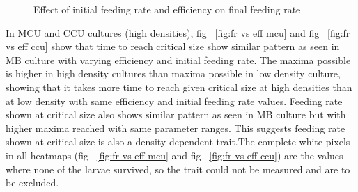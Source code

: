 \begin{figure}[h]
\caption{Effect of initial feeding rate and efficiency on final feeding rate}
\label{fig:fr_eff_frt}
\end{figure}
In MCU and CCU cultures (high densities), fig ~\ref{fig:fr vs eff mcu} and fig ~\ref{fig:fr vs eff ccu} show that time to reach critical size show similar pattern as seen in MB culture with varying efficiency and initial feeding rate. The maxima possible is higher in high density cultures than maxima possible in low density culture, showing that it takes more time to reach given critical size at high densities than at low density with same efficiency and initial feeding rate values. Feeding rate shown at critical size also shows similar pattern as seen in MB culture but with higher maxima reached with same parameter ranges. This suggests feeding rate shown at critical size is also a density dependent trait.The complete white pixels in all heatmaps (fig ~\ref{fig:fr vs eff mcu} and fig ~\ref{fig:fr vs eff ccu}) are the values where none of the larvae survived, so the trait could not be measured and are to be excluded.
